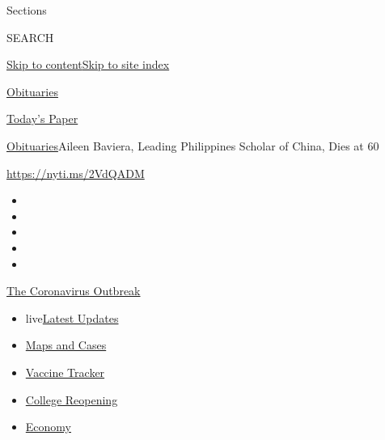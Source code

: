 Sections

SEARCH

\protect\hyperlink{site-content}{Skip to
content}\protect\hyperlink{site-index}{Skip to site index}

\href{https://www.nytimes.com/section/obituaries}{Obituaries}

\href{https://myaccount.nytimes.com/auth/login?response_type=cookie\&client_id=vi}{}

\href{https://www.nytimes.com/section/todayspaper}{Today's Paper}

\href{/section/obituaries}{Obituaries}\textbar{}Aileen Baviera, Leading
Philippines Scholar of China, Dies at 60

\url{https://nyti.ms/2VdQADM}

\begin{itemize}
\item
\item
\item
\item
\item
\end{itemize}

\href{https://www.nytimes.com/news-event/coronavirus?action=click\&pgtype=Article\&state=default\&region=TOP_BANNER\&context=storylines_menu}{The
Coronavirus Outbreak}

\begin{itemize}
\tightlist
\item
  live\href{https://www.nytimes.com/2020/08/03/world/coronavirus-covid-19.html?action=click\&pgtype=Article\&state=default\&region=TOP_BANNER\&context=storylines_menu}{Latest
  Updates}
\item
  \href{https://www.nytimes.com/interactive/2020/us/coronavirus-us-cases.html?action=click\&pgtype=Article\&state=default\&region=TOP_BANNER\&context=storylines_menu}{Maps
  and Cases}
\item
  \href{https://www.nytimes.com/interactive/2020/science/coronavirus-vaccine-tracker.html?action=click\&pgtype=Article\&state=default\&region=TOP_BANNER\&context=storylines_menu}{Vaccine
  Tracker}
\item
  \href{https://www.nytimes.com/2020/08/02/us/covid-college-reopening.html?action=click\&pgtype=Article\&state=default\&region=TOP_BANNER\&context=storylines_menu}{College
  Reopening}
\item
  \href{https://www.nytimes.com/live/2020/08/03/business/stock-market-today-coronavirus?action=click\&pgtype=Article\&state=default\&region=TOP_BANNER\&context=storylines_menu}{Economy}
\end{itemize}

